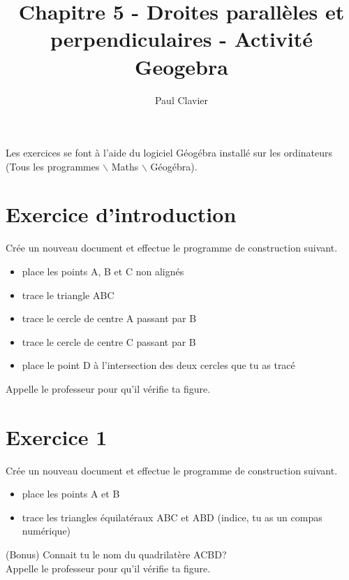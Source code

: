 \documentclass[12pt,a4paper]{article}
\author{Paul Clavier}
\title{Chapitre 5 - Droites parallèles et perpendiculaires - Activité Geogebra}
\begin{document}
\renewcommand\thesection{\Roman{section}}
\renewcommand\thesubsection{\arabic{subsection}}


\ifdefined\isprof
	\TeacherModeOn
\fi




\begin{center}
\end{center}

Les exercices se font à l'aide du logiciel Géogébra installé sur les ordinateurs (Tous les programmes $\backslash$ Maths $\backslash$ Géogébra).

\section*{Exercice d'introduction}
Crée un nouveau document et effectue le programme de construction suivant.
\begin{itemize}
\item place les points A, B et C non alignés
\item trace le triangle ABC
\item trace le cercle de centre A passant par B
\item trace le cercle de centre C passant par B
\item place le point D à l'intersection des deux cercles que tu as tracé
\end{itemize}
Appelle le professeur pour qu'il vérifie ta figure.

\section*{Exercice 1}
Crée un nouveau document et effectue le programme de construction suivant.
\begin{itemize}
\item place les points A et B
\item trace les triangles équilatéraux ABC et ABD (indice, tu as un compas numérique)
\end{itemize}
(Bonus) Connait tu le nom du quadrilatère ACBD? \\
Appelle le professeur pour qu'il vérifie ta figure.
\end{document}
